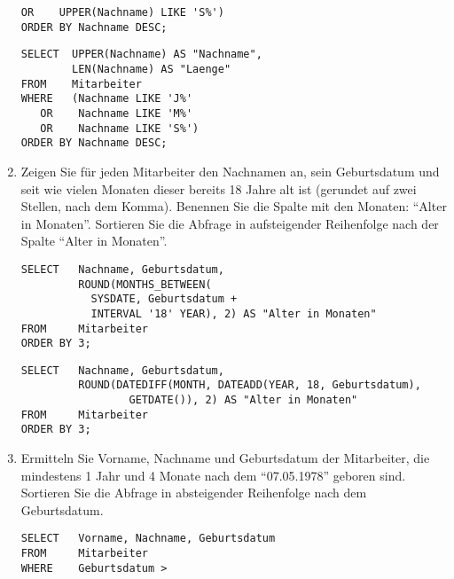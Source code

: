 \begin{enumerate}
\begin{lstlisting}[language=oracle_sql]
   OR    UPPER(Nachname) LIKE 'S%')
ORDER BY Nachname DESC;
        \end{lstlisting}
          \begin{mssql}[\FALSE]
          \end{mssql}
          \begin{lstlisting}[language=ms_sql]
SELECT  UPPER(Nachname) AS "Nachname",
        LEN(Nachname) AS "Laenge"
FROM    Mitarbeiter
WHERE   (Nachname LIKE 'J%'
   OR    Nachname LIKE 'M%'
   OR    Nachname LIKE 'S%')
ORDER BY Nachname DESC;
        \end{lstlisting}
    \item Zeigen Sie für jeden Mitarbeiter den Nachnamen an, sein
          Geburtsdatum und seit wie vielen Monaten dieser bereits 18 Jahre alt ist
          (gerundet auf zwei Stellen, nach dem Komma). Benennen Sie die Spalte mit
          den Monaten: \enquote{Alter in Monaten}. Sortieren Sie die Abfrage in
          aufsteigender Reihenfolge nach der Spalte \enquote{Alter in Monaten}.
          \begin{oraclesql}[\FALSE]
          \end{oraclesql}
          \begin{lstlisting}[language=oracle_sql]
SELECT   Nachname, Geburtsdatum,
         ROUND(MONTHS_BETWEEN(
           SYSDATE, Geburtsdatum + 
           INTERVAL '18' YEAR), 2) AS "Alter in Monaten"
FROM     Mitarbeiter
ORDER BY 3;
       \end{lstlisting}
          \begin{mssql}[\FALSE]
          \end{mssql}
          \begin{lstlisting}[language=ms_sql]
SELECT   Nachname, Geburtsdatum,
         ROUND(DATEDIFF(MONTH, DATEADD(YEAR, 18, Geburtsdatum),
                 GETDATE()), 2) AS "Alter in Monaten"
FROM     Mitarbeiter
ORDER BY 3;
        \end{lstlisting}
    \item Ermitteln Sie Vorname, Nachname und Geburtsdatum der Mitarbeiter,
          die mindestens 1 Jahr und 4 Monate nach dem \enquote{07.05.1978} geboren
          sind. Sortieren Sie die Abfrage in absteigender Reihenfolge nach dem
          Geburtsdatum.
          \begin{oraclesql}[\FALSE]
          \end{oraclesql}
          \begin{lstlisting}[language=oracle_sql]
SELECT   Vorname, Nachname, Geburtsdatum
FROM     Mitarbeiter
WHERE    Geburtsdatum >

\end{lstlisting}
\end{enumerate}
